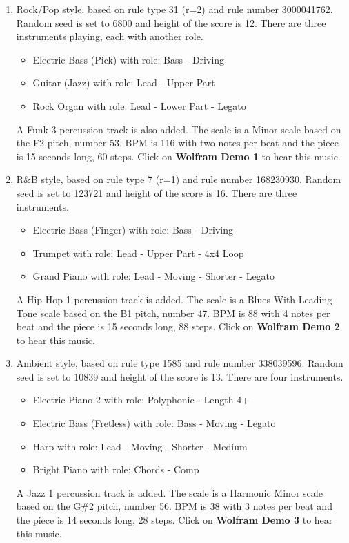 \documentclass[12pt]{article}
\begin{document}
\begin{enumerate}
\item Rock/Pop style, based on rule type 31 (r=2) and rule number 3000041762. Random seed is set to 6800 and height of the score is 12. There are three instruments playing, each with another role.
\begin{itemize}
\item Electric Bass (Pick) with role: Bass - Driving
\item Guitar (Jazz) with role: Lead - Upper Part
\item Rock Organ with role: Lead - Lower Part - Legato 
\end{itemize}
A Funk 3 percussion track is also added. The scale is a Minor scale based on the F2 pitch, number 53. BPM is 116 with two notes per beat and the piece is 15 seconds long, 60 steps. Click on \textbf{Wolfram Demo 1} to hear this music.

\item R\&B style, based on rule type 7 (r=1) and rule number 168230930. Random seed is set to 123721 and height of the score is 16.
There are three instruments.
\begin{itemize}
\item Electric Bass (Finger) with role: Bass - Driving
\item Trumpet with role: Lead - Upper Part - 4x4 Loop
\item Grand Piano with role: Lead - Moving - Shorter - Legato 
\end{itemize}
A Hip Hop 1 percussion track is added. The scale is a Blues With Leading Tone scale based on the B1 pitch, number 47. BPM is 88 with 4 notes per beat and the piece is 15 seconds long, 88 steps. Click on \textbf{Wolfram Demo 2} to hear this music.

\item Ambient style, based on rule type 1585 and rule number 338039596. Random seed is set to 10839 and height of the score is 13.
There are four instruments.
\begin{itemize}
\item Electric Piano 2 with role: Polyphonic - Length 4+
\item Electric Bass (Fretless) with role: Bass - Moving - Legato
\item Harp with role: Lead - Moving - Shorter - Medium
\item Bright Piano with role: Chords - Comp
\end{itemize}
A Jazz 1 percussion track is added. The scale is a Harmonic Minor scale based on the G\#2 pitch, number 56. BPM is 38 with 3 notes per beat and the piece is 14 seconds long, 28 steps. Click on \textbf{Wolfram Demo 3} to hear this music.
\end{enumerate}
\end{document}
